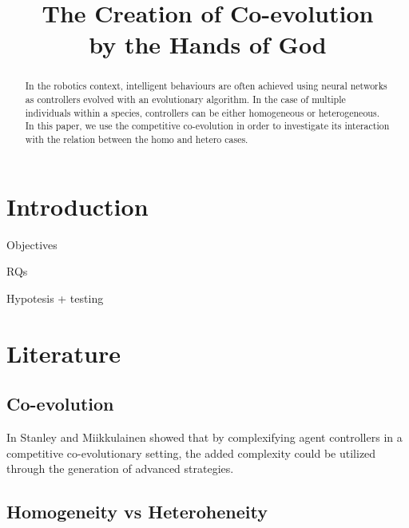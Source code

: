 \documentclass[conference]{IEEEtran}
\begin{document}
\title{The Creation of Co-evolution \\ by the Hands of God}



\author{
}



\maketitle


\begin{abstract}
In the robotics context, intelligent behaviours are often achieved using neural networks as controllers evolved with an evolutionary algorithm. 
In the case of multiple individuals within a species, controllers can be either homogeneous or heterogeneous. 
In this paper, we use the competitive co-evolution in order to investigate its interaction with the relation between the homo and hetero cases. 
\end{abstract}


\IEEEpeerreviewmaketitle


\section{Introduction}
Objectives

RQs

Hypotesis + testing


\section{Literature}
 

\subsection{Co-evolution}
In \cite{stanley2004competitive} Stanley and Miikkulainen showed that by complexifying agent controllers in a competitive co-evolutionary setting, the added complexity could be utilized through the generation of advanced strategies.

\subsection{Homogeneity vs Heteroheneity}
\end{document}
